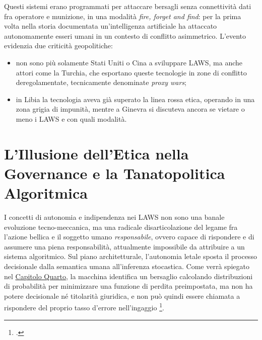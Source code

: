 \documentclass[a4paper,12pt]{report}
\begin{document}
Questi sistemi erano programmati per attaccare bersagli senza connettività dati
fra operatore e munizione, in una modalità \textit{fire, forget and find}: per la
prima volta nella storia documentata un'intelligenza artificiale ha attaccato
autonomamente esseri umani in un contesto di conflitto asimmetrico. L'evento
evidenzia due criticità geopolitiche:
 
\begin{itemize}
  \item non sono più solamente Stati Uniti o Cina a sviluppare LAWS, ma anche
  attori come la Turchia, che esportano queste tecnologie in zone di conflitto
  deregolamentate, tecnicamente denominate \textit{proxy wars};
  \item in Libia la tecnologia aveva già superato la linea rossa etica, operando
  in una zona grigia di impunità, mentre a Ginevra si discuteva ancora se
  vietare o meno i LAWS e con quali modalità.
\end{itemize}


\chapter[Governance e Tanatopolitica Algoritmica]{L'Illusione dell'Etica nella Governance e la Tanatopolitica Algoritmica}
\label{cap2}

I concetti di autonomia e indipendenza nei LAWS non sono una banale evoluzione
tecno-meccanica, ma una radicale disarticolazione del legame fra l'azione bellica
e il soggetto umano \textit{responsabile}, ovvero capace di rispondere e di
assumere una piena responsabilità, attualmente impossibile da attribuire a un
sistema algoritmico. Sul piano architetturale, l'autonomia letale sposta il
processo decisionale dalla semantica umana all'inferenza stocastica. Come verrà spiegato nel
\hyperref[cap4]{Capitolo Quarto}, la macchina identifica un bersaglio calcolando distribuzioni di
probabilità per minimizzare una funzione di perdita preimpostata, ma non ha potere decisionale né titolarità giuridica, e non può quindi essere
chiamata a rispondere del proprio tasso d'errore nell'ingaggio \footcite{simmons_edler_2025}.
\end{document}
